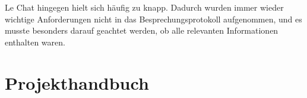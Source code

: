Le Chat hingegen hielt sich häufig zu knapp. Dadurch wurden immer wieder wichtige Anforderungen nicht in das Besprechungsprotokoll 
aufgenommen, und es musste besonders darauf geachtet werden, ob alle relevanten Informationen enthalten waren.


\section{Projekthandbuch}  \label{CompProjekthandbuch}

